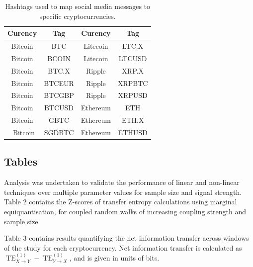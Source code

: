 \documentclass[]{rsos}%
\begin{document}
  \begin{table}[!htb]
    \label{t.table1}
    \caption{\label{tab:table1} Hashtags used to map social media messages to specific cryptocurrencies.}
    
      \begin{tabular}{cccc}
        Curency & Tag & Curency & Tag        \\ [0.5ex] 
        \hline 
        Bitcoin & BTC &  Litecoin & LTC.X    \\
        Bitcoin & BCOIN & Litecoin & LTCUSD  \\
        Bitcoin & BTC.X & Ripple & XRP.X     \\
        Bitcoin & BTCEUR & Ripple & XRPBTC   \\
        Bitcoin & BTCGBP & Ripple & XRPUSD   \\
        Bitcoin & BTCUSD & Ethereum & ETH    \\
        Bitcoin & GBTC & Ethereum & ETH.X    \\\
        Bitcoin & SGDBTC & Ethereum & ETHUSD \\
      \end{tabular}
    
    \end{table}

  
  \subsection{Tables} \label{a.tables}

  Analysis was undertaken to validate the performance of linear and non-linear techniques over multiple parameter values for sample size and signal strength. Table {\color{blue}2} contains the Z-scores of transfer entropy calculations using marginal equiquantisation, for coupled random walks of increasing coupling strength and sample size. 
  
  Table {\color{blue}3} contains results quantifying the net information transfer across windows of the study for each cryptocurrency. Net information transfer is calculated as $ \operatorname{TE}^{(1)}_{X \rightarrow Y} - \operatorname{TE}^{(1)}_{Y \rightarrow X} $, and is given in units of bits.
\end{document}
